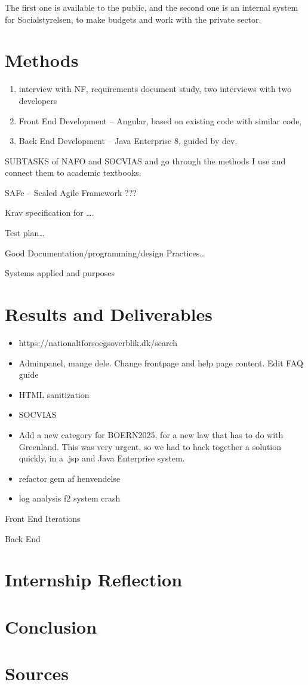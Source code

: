 \documentclass[../main.tex]{subfiles}
\begin{document}
The first one is available to the public, and the second one is an internal system for Socialstyrelsen, to make budgets and work with the private sector. 

\section{Methods}

\begin{enumerate}
\item interview with NF, requirements document study, two interviews with two developers 
\item Front End Development – Angular, based on existing code with similar code,  
\item Back End Development – Java Enterprise 8, guided by dev. 
\end{enumerate}

SUBTASKS of NAFO and SOCVIAS and go through the methods I use and connect them to academic textbooks.  

SAFe – Scaled Agile Framework ??? 

Krav specification for …. 

Test plan… 

Good Documentation/programming/design Practices… 

Systems applied and purposes 
\section{Results and Deliverables}

\begin{itemize}
    \item https://nationaltforsoegsoverblik.dk/search 
    \item Adminpanel, mange dele. Change frontpage and help page content. Edit FAQ guide 
    \item HTML sanitization 
    \item SOCVIAS 
    \item Add a new category for BOERN2025, for a new law that has to do with Greenland. This was very urgent, so we had to hack together a solution quickly, in a .jsp and Java Enterprise system. 
    \item refactor gem af henvendelse
    \item log analysis f2 system crash
\end{itemize}


Front End Iterations 

Back End 
\section{Internship Reflection}

\section{Conclusion}

\section{Sources}
\end{document}
